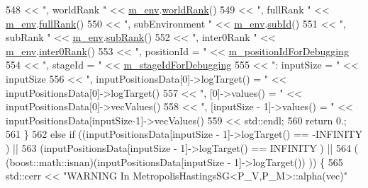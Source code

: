 \begin{DoxyCode}
548               << \textcolor{stringliteral}{", worldRank "}      << \hyperlink{class_q_u_e_s_o_1_1_metropolis_hastings_s_g_ac8ea061e55b920e0c8f9bce5c3f20e52}{m\_env}.\hyperlink{class_q_u_e_s_o_1_1_base_environment_a78b57112bbd0e6dd0e8afec00b40ffa7}{worldRank}()
549               << \textcolor{stringliteral}{", fullRank "}       << \hyperlink{class_q_u_e_s_o_1_1_metropolis_hastings_s_g_ac8ea061e55b920e0c8f9bce5c3f20e52}{m\_env}.\hyperlink{class_q_u_e_s_o_1_1_base_environment_a84a239e42ae443cf71db6e03e8159620}{fullRank}()
550               << \textcolor{stringliteral}{", subEnvironment "} << \hyperlink{class_q_u_e_s_o_1_1_metropolis_hastings_s_g_ac8ea061e55b920e0c8f9bce5c3f20e52}{m\_env}.\hyperlink{class_q_u_e_s_o_1_1_base_environment_a6ae3174897a9b3a4c85fa18da5d4c16f}{subId}()
551               << \textcolor{stringliteral}{", subRank "}        << \hyperlink{class_q_u_e_s_o_1_1_metropolis_hastings_s_g_ac8ea061e55b920e0c8f9bce5c3f20e52}{m\_env}.\hyperlink{class_q_u_e_s_o_1_1_base_environment_a172d52f993f1322ed45aaddf71518dbb}{subRank}()
552               << \textcolor{stringliteral}{", inter0Rank "}     << \hyperlink{class_q_u_e_s_o_1_1_metropolis_hastings_s_g_ac8ea061e55b920e0c8f9bce5c3f20e52}{m\_env}.\hyperlink{class_q_u_e_s_o_1_1_base_environment_ae106b5bb8a80b655b88b3a26b1e7c185}{inter0Rank}()
553               << \textcolor{stringliteral}{", positionId = "}   << \hyperlink{class_q_u_e_s_o_1_1_metropolis_hastings_s_g_a49500f5107190c94813e232cd806c2bc}{m\_positionIdForDebugging}
554               << \textcolor{stringliteral}{", stageId = "}      << \hyperlink{class_q_u_e_s_o_1_1_metropolis_hastings_s_g_aca9351ab468808759b8b19686231ae4f}{m\_stageIdForDebugging}
555               << \textcolor{stringliteral}{": inputSize = "}    << inputSize
556               << \textcolor{stringliteral}{", inputPositionsData[0]->logTarget() = "} << inputPositionsData[0]->logTarget()
557               << \textcolor{stringliteral}{", [0]->values() = "}                      << inputPositionsData[0]->vecValues()
558               << \textcolor{stringliteral}{", [inputSize - 1]->values() = "}          << inputPositionsData[inputSize-1]->vecValues()
559               << std::endl;
560     \textcolor{keywordflow}{return} 0.;
561   \}
562   \textcolor{keywordflow}{else} \textcolor{keywordflow}{if} ((inputPositionsData[inputSize - 1]->logTarget() == -INFINITY           ) ||
563            (inputPositionsData[inputSize - 1]->logTarget() ==  INFINITY           ) ||
564            ( (boost::math::isnan)(inputPositionsData[inputSize - 1]->logTarget()) )) \{
565     std::cerr << \textcolor{stringliteral}{"WARNING In MetropolisHastingsSG<P\_V,P\_M>::alpha(vec)"}

\end{DoxyCode}
